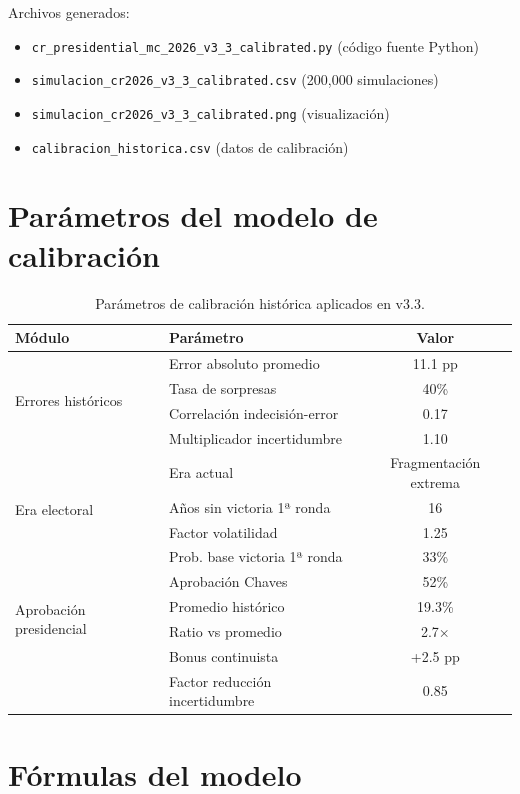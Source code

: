 \documentclass[11pt,a4paper]{article}
\begin{document}
Archivos generados:
\begin{itemize}[noitemsep]
    \item \texttt{cr\_presidential\_mc\_2026\_v3\_3\_calibrated.py} (código fuente Python)
    \item \texttt{simulacion\_cr2026\_v3\_3\_calibrated.csv} (200,000 simulaciones)
    \item \texttt{simulacion\_cr2026\_v3\_3\_calibrated.png} (visualización)
    \item \texttt{calibracion\_historica.csv} (datos de calibración)
\end{itemize}

\appendix

\section{Parámetros del modelo de calibración}

\begin{table}[H]
\centering
\caption{Parámetros de calibración histórica aplicados en v3.3.}
\begin{tabular}{@{}llc@{}}
\toprule
\textbf{Módulo} & \textbf{Parámetro} & \textbf{Valor} \\
\midrule
\multirow{4}{*}{Errores históricos} & Error absoluto promedio & 11.1 pp \\
& Tasa de sorpresas & 40\% \\
& Correlación indecisión-error & 0.17 \\
& Multiplicador incertidumbre & 1.10 \\
\midrule
\multirow{4}{*}{Era electoral} & Era actual & Fragmentación extrema \\
& Años sin victoria 1ª ronda & 16 \\
& Factor volatilidad & 1.25 \\
& Prob. base victoria 1ª ronda & 33\% \\
\midrule
\multirow{4}{*}{Aprobación presidencial} & Aprobación Chaves & 52\% \\
& Promedio histórico & 19.3\% \\
& Ratio vs promedio & 2.7$\times$ \\
& Bonus continuista & +2.5 pp \\
& Factor reducción incertidumbre & 0.85 \\
\bottomrule
\end{tabular}
\end{table}

\section{Fórmulas del modelo}
\end{document}
